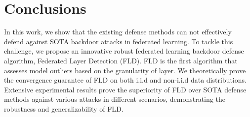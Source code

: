 \section{Conclusions}
In this work, we show that the existing defense methods can not effectively defend against SOTA backdoor attacks in federated learning. To tackle this challenge, we propose an innovative robust federated learning backdoor defense algorithm, Federated Layer Detection (FLD). FLD is the first algorithm that assesses model outliers based on the granularity of layer. We theoretically prove the convergence guarantee of FLD on both i.i.d and non-i.i.d data distributions. Extensive experimental results prove the superiority of FLD over SOTA defense methods against various attacks in different scenarios, demonstrating the robustness and generalizability of FLD.